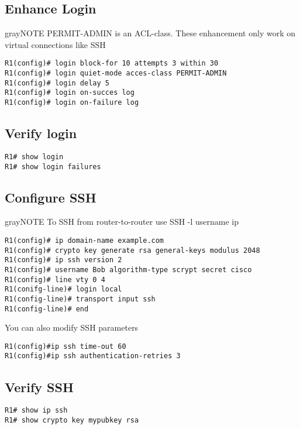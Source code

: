 \subsection{Enhance Login}
\begin{textbox}{gray}{NOTE}
PERMIT-ADMIN is an ACL-class. These enhancement only work on virtual connections like SSH
\end{textbox}
\begin{verbatim}
R1(config)# login block-for 10 attempts 3 within 30 
R1(config)# login quiet-mode acces-class PERMIT-ADMIN 
R1(config)# login delay 5 
R1(config)# login on-succes log
R1(config)# login on-failure log
\end{verbatim}

\subsection{Verify login}
\begin{verbatim}
R1# show login
R1# show login failures
\end{verbatim}

\subsection{Configure SSH }
\begin{textbox}{gray}{NOTE}
To SSH from router-to-router use SSH -l username ip 
\end{textbox}
\begin{verbatim}
R1(config)# ip domain-name example.com
R1(config)# crypto key generate rsa general-keys modulus 2048
R1(config)# ip ssh version 2 
R1(config)# username Bob algorithm-type scrypt secret cisco
R1(config)# line vty 0 4
R1(conifg-line)# login local
R1(config-line)# transport input ssh 
R1(config-line)# end
\end{verbatim}

You can also modify SSH parameters

\begin{verbatim}
R1(config)#ip ssh time-out 60
R1(config)#ip ssh authentication-retries 3 
\end{verbatim}

\subsection{Verify SSH}
\begin{verbatim}
R1# show ip ssh
R1# show crypto key mypubkey rsa 
\end{verbatim}

